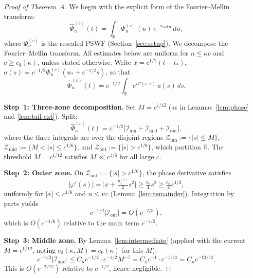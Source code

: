 \documentclass[12pt,a4paper]{amsart}
\theoremstyle{definition}
\theoremstyle{remark}
\newcommand{\ustar}{u_*}
\newcommand{\tstar}{t_*}
\begin{document}
\begin{proof}[Proof of Theorem~A]
We begin with the explicit form of the Fourier--Mellin transform:
\[
  \widehat{\Phi}_n^{(c)}(t)
  = \int_{\mathbb{R}} \Phi_n^{(c)}(u)\,e^{-2\pi i t u}\,du,
\]
where $\Phi_n^{(c)}$ is the rescaled PSWF (Section~\ref{sec:setup}).
We decompose the Fourier--Mellin transform.
All estimates below are uniform for $n \le \kappa c$
and $c \ge c_0(\kappa)$, unless stated otherwise.
Write $x = c^{1/2}(t - \tstar)$,
$a(s) = c^{-1/2}\Phi_n^{(c)}(\ustar + c^{-1/2}s)$,
so that
\[
  \widehat{\Phi}_n^{(c)}(t)
  = c^{-1/2}\int_{\mathbb{R}}
    e^{i\Psi(s,x)}\,a(s)\,ds.
\]

\medskip
\noindent\textbf{Step~1: Three-zone decomposition.}
Set $M = c^{1/12}$ (as in Lemmas~\ref{lem:phase}
and \ref{lem:tail-ext}).
Split:
\[
  \widehat{\Phi}_n^{(c)}(t)
  = c^{-1/2}\bigl[
    \mathcal{I}_{\mathrm{inn}}
    + \mathcal{I}_{\mathrm{mid}}
    + \mathcal{I}_{\mathrm{out}}
  \bigr],
\]
where the three integrals are over the disjoint regions
$\mathcal{Z}_{\mathrm{inn}} := \{|s| \le M\}$,
$\mathcal{Z}_{\mathrm{mid}} := \{M < |s| \le c^{1/6}\}$,
and $\mathcal{Z}_{\mathrm{out}} := \{|s| > c^{1/6}\}$,
which partition $\mathbb{R}$.
The threshold $M = c^{1/12}$ satisfies $M \ll c^{1/6}$ for all large $c$.

\medskip
\noindent\textbf{Step~2: Outer zone.}
On $\mathcal{Z}_{\mathrm{out}} := \{|s| > c^{1/6}\}$,
the phase derivative satisfies
\[
  |\varphi'(s)| = \bigl|x + \tfrac{\mu_n^{(c)}}{2}s^2\bigr|
  \ge \tfrac{c_\kappa}{4}s^2 \ge \tfrac{c_\kappa}{4}c^{1/3},
\]
uniformly for $|x| \le c^{1/6}$ and $n \le \kappa c$
(Lemma~\ref{lem:remainder}).
Integration by parts yields
\[
  c^{-1/2}|\mathcal{I}_{\mathrm{out}}|
  = O(c^{-2/3}),
\]
which is $O(c^{-1/6})$ relative to the main term $c^{-1/2}$.

\medskip
\noindent\textbf{Step~3: Middle zone.}
By Lemma~\ref{lem:intermediate}
(applied with the current $M = c^{1/12}$,
noting $c_0(\kappa, M) = c_0(\kappa)$ for this $M$):
\[
  c^{-1/2}|\mathcal{I}_{\mathrm{mid}}|
  \le C_\kappa c^{-1/2} \cdot c^{-1/2} M^{-1}
  = C_\kappa c^{-1} \cdot c^{-1/12}
  = C_\kappa c^{-13/12}.
\]
This is $O(c^{-7/12})$ relative to $c^{-1/2}$,
hence negligible.


\end{proof}
\end{document}
